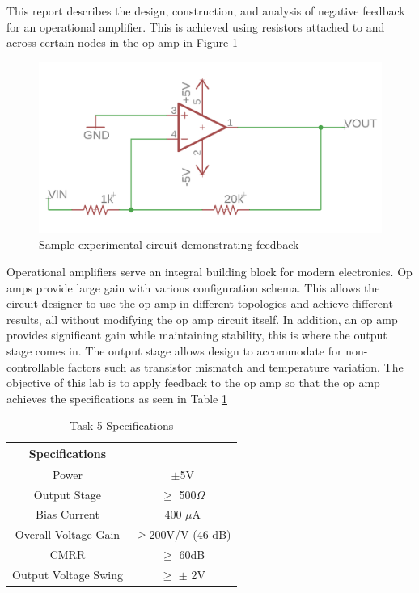 



	
This report describes the design, construction, and analysis of negative feedback for an operational amplifier. This is achieved using  resistors attached to and across certain nodes in the op amp in Figure \ref{fig:sample}


\begin{figure}[H]
	\begin{center}
		\includegraphics[scale=.40]{Introduction/invertingschem.png}
		\caption{Sample experimental circuit demonstrating feedback}
		\label{fig:sample}
	\end{center}
\end{figure}
	
	
	
	
	
Operational amplifiers serve an integral building block for modern electronics. Op amps provide large gain with various configuration schema. This allows the circuit designer to use the op amp in different topologies and achieve different results, all without modifying the op amp circuit itself. In addition, an op amp provides significant gain while maintaining stability, this is where the output stage comes in. The output stage allows design to accommodate for non-controllable factors such as transistor mismatch and temperature variation.   The objective of this lab is to apply feedback to the op amp so that the op amp achieves the specifications as seen in Table \ref{tab:labspecs}

\begin{table}[H]
	\centering
	\caption{Task 5 Specifications}
	\label{tab:labspecs}
	\begin{tabular}{|c|c|}
			\hline
			\textbf{Specifications} &                 \\ \hline
			Power                   & $\pm$5V         \\ \hline
			Output Stage 			& $\geq$ 500$\Omega$ \\ \hline
			Bias Current            & 400 $\mu$A      \\ \hline
			Overall Voltage Gain    & $\geq$200V/V (46 dB)  \\ \hline
			CMRR                    & $\geq$ 60dB     \\ \hline
			Output Voltage Swing    & $\geq$ $\pm$ 2V \\ \hline
		\end{tabular}
\end{table}

